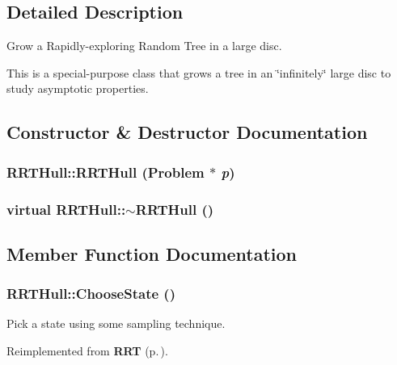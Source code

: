 \subsection{Detailed Description}
Grow a Rapidly-exploring Random Tree in a large disc.

This is a special-purpose class that grows a tree in an \char`\"{}infinitely\char`\"{} large disc to study asymptotic properties. 



\subsection{Constructor \& Destructor Documentation}
\subsubsection{\setlength{\rightskip}{0pt plus 5cm}RRTHull::RRTHull ({\bf Problem} $\ast$ {\em p})}\label{classRRTHull_a0}


\subsubsection{\setlength{\rightskip}{0pt plus 5cm}virtual RRTHull::$\sim$RRTHull ()\hspace{0.3cm}{\tt  [inline, virtual]}}\label{classRRTHull_a1}




\subsection{Member Function Documentation}
\subsubsection{ RRTHull::Choose\-State ()\hspace{0.3cm}{\tt  [protected, virtual]}}\label{classRRTHull_b0}


Pick a state using some sampling technique.



Reimplemented from {\bf RRT} {\rm (p.\,\pageref{classRRT_b4})}.

